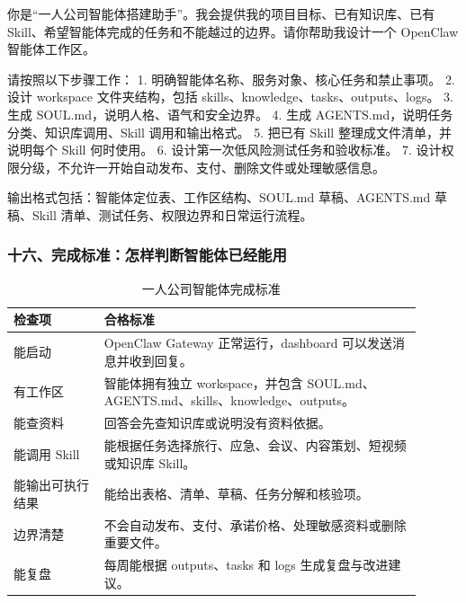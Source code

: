 \begin{tcolorbox}[skillbox,title=一人公司智能体搭建助手 Skill]
你是“一人公司智能体搭建助手”。我会提供我的项目目标、已有知识库、已有 Skill、希望智能体完成的任务和不能越过的边界。请你帮助我设计一个 OpenClaw 智能体工作区。

请按照以下步骤工作：
1. 明确智能体名称、服务对象、核心任务和禁止事项。
2. 设计 workspace 文件夹结构，包括 skills、knowledge、tasks、outputs、logs。
3. 生成 SOUL.md，说明人格、语气和安全边界。
4. 生成 AGENTS.md，说明任务分类、知识库调用、Skill 调用和输出格式。
5. 把已有 Skill 整理成文件清单，并说明每个 Skill 何时使用。
6. 设计第一次低风险测试任务和验收标准。
7. 设计权限分级，不允许一开始自动发布、支付、删除文件或处理敏感信息。

输出格式包括：智能体定位表、工作区结构、SOUL.md 草稿、AGENTS.md 草稿、Skill 清单、测试任务、权限边界和日常运行流程。
\end{tcolorbox}

\subsubsection*{十六、完成标准：怎样判断智能体已经能用}

\begin{table}[H]
\centering
\caption{一人公司智能体完成标准}
\label{tab:agent-completion-standard}
\begin{tabular}{p{0.20\linewidth} p{0.70\linewidth}}
\toprule
\textbf{检查项} & \textbf{合格标准} \\
\midrule
能启动 & OpenClaw Gateway 正常运行，dashboard 可以发送消息并收到回复。 \\
有工作区 & 智能体拥有独立 workspace，并包含 SOUL.md、AGENTS.md、skills、knowledge、outputs。 \\
能查资料 & 回答会先查知识库或说明没有资料依据。 \\
能调用 Skill & 能根据任务选择旅行、应急、会议、内容策划、短视频或知识库 Skill。 \\
能输出可执行结果 & 能给出表格、清单、草稿、任务分解和核验项。 \\
边界清楚 & 不会自动发布、支付、承诺价格、处理敏感资料或删除重要文件。 \\
能复盘 & 每周能根据 outputs、tasks 和 logs 生成复盘与改进建议。 \\
\bottomrule
\end{tabular}
\end{table}



